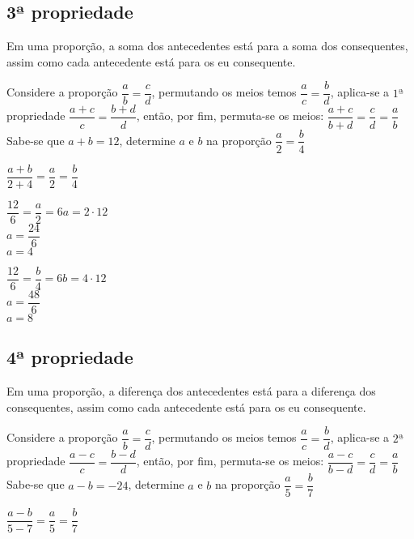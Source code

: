 \begin{enumerate}
\subsection{3ª propriedade}

Em uma proporção, a soma dos antecedentes está para a soma dos consequentes, assim como cada antecedente está para os eu consequente.

Considere a proporção $ \dfrac{a}{b} = \dfrac{c}{d} $, permutando os meios temos $ \dfrac{a}{c} = \dfrac{b}{d} $, aplica-se a $ 1ª $ propriedade $ \dfrac{a+c}{c} = \dfrac{b+d}{d} $, então, por fim, permuta-se os meios: $ \dfrac{a+c}{b+d} = \dfrac{c}{d} = \dfrac{a}{b} $\\

Sabe-se que $ a+b = 12 $, determine $ a $ e $ b $ na proporção $ \dfrac{a}{2} = \dfrac{b}{4} $

$ \dfrac{a+b}{2+4} = \dfrac{a}{2} = \dfrac{b}{4} $

\begin{multicols}{2}
$ \dfrac{12}{6} = \dfrac{a}{2} = 6a = 2 \cdot 12$\\

$ a = \dfrac{24}{6}$\\

$ a = 4 $
\columnbreak

$ \dfrac{12}{6} = \dfrac{b}{4} = 6b = 4 \cdot 12$\\

$ a = \dfrac{48}{6}$\\

$ a = 8 $
\end{multicols}


\subsection{4ª propriedade}

Em uma proporção, a diferença dos antecedentes está para a diferença dos consequentes, assim como cada antecedente está para os eu consequente.

Considere a proporção $ \dfrac{a}{b} = \dfrac{c}{d} $, permutando os meios temos $ \dfrac{a}{c} = \dfrac{b}{d} $, aplica-se a $ 2ª $ propriedade $ \dfrac{a-c}{c} = \dfrac{b-d}{d} $, então, por fim, permuta-se os meios: $ \dfrac{a-c}{b-d} = \dfrac{c}{d} = \dfrac{a}{b} $\\

Sabe-se que $ a-b = -24 $, determine $ a $ e $ b $ na proporção $ \dfrac{a}{5} = \dfrac{b}{7} $

$ \dfrac{a-b}{5-7} = \dfrac{a}{5} = \dfrac{b}{7} $


\end{enumerate}
